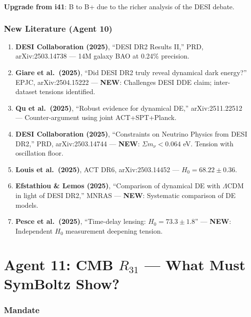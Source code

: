 \documentclass[11pt,a4paper]{article}
\newcommand{\NEW}{\textcolor{dfdblue}{\textbf{NEW}}}
\begin{document}
\textbf{Upgrade from i41}: B to B+ due to the richer analysis of the DESI debate.

\section{New Literature (Agent 10)}

\begin{enumerate}
\item \textbf{DESI Collaboration (2025)}, ``DESI DR2 Results II,'' PRD, arXiv:2503.14738 --- 14M galaxy BAO at 0.24\% precision.

\item \textbf{Giare et al.\ (2025)}, ``Did DESI DR2 truly reveal dynamical dark energy?'' EPJC, arXiv:2504.15222 --- \NEW: Challenges DESI DDE claim; inter-dataset tensions identified.

\item \textbf{Qu et al.\ (2025)}, ``Robust evidence for dynamical DE,'' arXiv:2511.22512 --- Counter-argument using joint ACT+SPT+Planck.

\item \textbf{DESI Collaboration (2025)}, ``Constraints on Neutrino Physics from DESI DR2,'' PRD, arXiv:2503.14744 --- \NEW: $\Sigma m_\nu < 0.064$ eV. Tension with oscillation floor.

\item \textbf{Louis et al.\ (2025)}, ACT DR6, arXiv:2503.14452 --- $H_0 = 68.22 \pm 0.36$.

\item \textbf{Efstathiou \& Lemos (2025)}, ``Comparison of dynamical DE with $\Lambda$CDM in light of DESI DR2,'' MNRAS --- \NEW: Systematic comparison of DE models.

\item \textbf{Pesce et al.\ (2025)}, ``Time-delay lensing: $H_0 = 73.3 \pm 1.8$'' --- \NEW: Independent $H_0$ measurement deepening tension.
\end{enumerate}


\part{Agent 11: CMB $R_{31}$ --- What Must SymBoltz Show?}
\label{part:agent11}

\section{Mandate}
\end{document}

